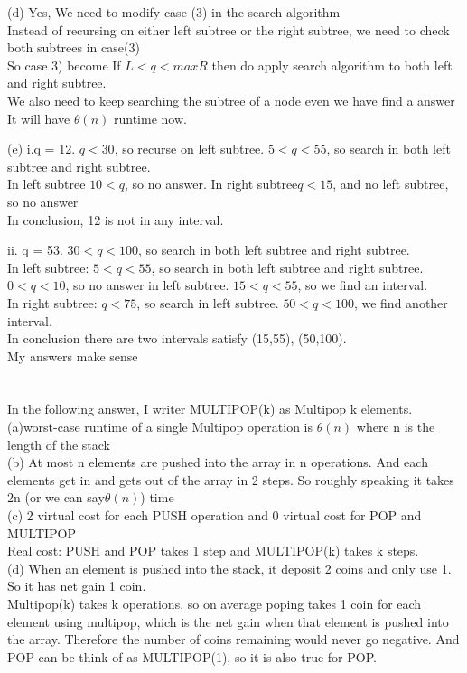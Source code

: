 \documentclass[12pt]{article}
\begin{document}
(d) Yes, We need to modify case (3) in the search algorithm \\
Instead of recursing on either left subtree or the right subtree, we need to check both subtrees in case(3)\\
So case 3) become If $L<q<maxR$ then do apply search algorithm to both left and right subtree.\\
We also need to keep searching the subtree of a node even we have find a answer\\
It will have $\theta(n)$ runtime now.

(e) i.q = 12. $q<30$, so recurse on left subtree.  $5<q<55$, so search in both left subtree and right subtree.\\
In left subtree $10<q$, so no answer. In right subtree$ q<15$, and no left subtree, so no answer\\
In conclusion, 12 is not in any interval.

ii. q = 53. $30<q<100$, so search in both left subtree and right subtree.\\
In left subtree:  $5<q<55$, so search in both left subtree and right subtree. $ 0<q<10$, so no answer in left subtree. $15 <q <55$, so we find an interval.\\
In right subtree: $q<75$, so search in left subtree. $50<q<100$, we find another interval.\\
In conclusion there are two intervals satisfy (15,55), (50,100).\\

My answers make sense
\pagebreak
\section{}
In the following answer, I writer MULTIPOP(k) as Multipop k elements.
(a)worst-case runtime of a single Multipop operation is $\theta(n)$ where n is the length of the stack\\

(b) At most n elements are pushed into the array in n operations. And each elements get in and gets out of the array in 2 steps. So roughly speaking it takes 2n (or we can say$\theta(n)$) time\\

(c) 2 virtual cost for each PUSH operation and 0 virtual cost for POP and MULTIPOP\\
Real cost: PUSH and POP takes 1 step and MULTIPOP(k) takes k steps.\\

(d) When an element is pushed into the stack, it deposit 2 coins and only use 1. So it has net gain 1 coin.\\
Multipop(k) takes k operations, so on average poping takes 1 coin for each element using multipop, which is the net gain when that element is pushed into the array. Therefore the number of coins remaining would never go negative. And POP can be think of as MULTIPOP(1), so it is also true for POP.\\
\end{document}

